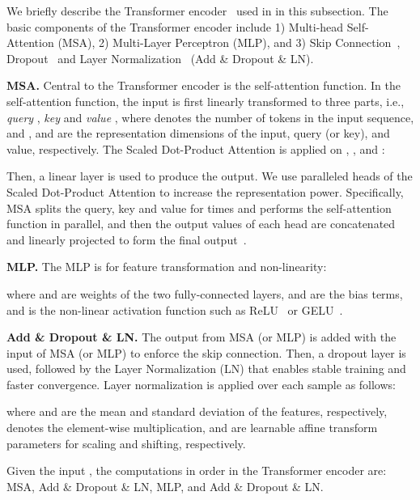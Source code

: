 \documentclass[runningheads]{llncs}
\begin{document}
We briefly describe the Transformer encoder~\cite{vaswani2017attention} used in \mtx in this subsection. The basic components of the Transformer encoder include 1) Multi-head Self-Attention (MSA), 2) Multi-Layer Perceptron (MLP), and 3) Skip Connection~\cite{he2016deep}, Dropout~\cite{srivastava2014dropout} and Layer Normalization~\cite{ba2016layer} (Add \& Dropout \& LN).
 

\noindent \textbf{MSA.} 
Central to the Transformer encoder is the self-attention function.
In the self-attention function, the input  is first linearly transformed to three parts, i.e., \textit{query} , \textit{key}  and \textit{value} ,  where  denotes the number of tokens in the input sequence, and ,  and  are the representation dimensions of the input, query (or key), and value, respectively. The Scaled Dot-Product Attention is applied on , , and : 



Then, a linear layer is used to produce the output. 
We use  paralleled heads of the Scaled Dot-Product Attention to increase the representation power. 
Specifically, MSA splits the query, key and value for  times and performs the self-attention function in parallel, and then the output values of each head are concatenated and linearly projected to form the final output~\cite{han2021transformer}.


\noindent \textbf{MLP.} The MLP is for feature transformation and non-linearity:



where  and  are weights of the two fully-connected layers,  and  are the bias terms, and  is the non-linear activation function such as ReLU~\cite{glorot2011deep} or GELU~\cite{hendrycks2016gaussian}. 


\noindent \textbf{Add \& Dropout \& LN.} The output from MSA (or MLP) is added with the input of MSA (or MLP) to enforce the skip connection. Then, a dropout layer is used, followed by the Layer Normalization (LN) that enables stable training and faster convergence. Layer normalization is applied over each sample  as follows:

where  and  are the mean and standard deviation of the features, respectively,  denotes the element-wise multiplication,  and  are learnable affine transform parameters for scaling and shifting, respectively.

Given the input , the computations in order in the Transformer encoder are: MSA, Add \& Dropout \& LN, MLP, and Add \& Dropout \& LN. 
\end{document}
